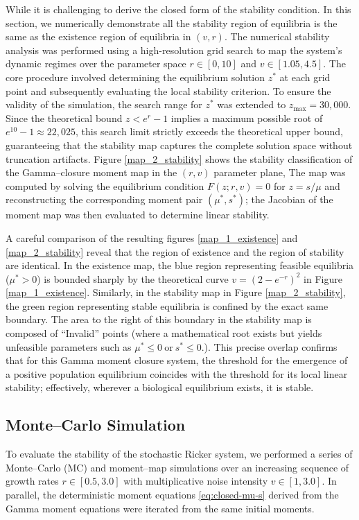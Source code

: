 \documentclass[12pt]{article}
\theoremstyle{definition}
\begin{document}
While it is challenging to derive the closed form of the stability condition. In this section, we numerically demonstrate all the stability region of equilibria is the same as the existence region of equilibria in $(v,r)$. The numerical stability analysis was performed using a high-resolution grid search to map the system's dynamic regimes over the parameter space $r \in [0, 10]$ and $v \in [1.05, 4.5]$. The core procedure involved determining the equilibrium solution $z^*$ at each grid point and subsequently evaluating the local stability criterion. To ensure the validity of the simulation, the search range for $z^*$ was extended to $z_{\text{max}} = 30,000$. Since the theoretical bound $z < e^r - 1$ implies a maximum possible root of $e^{10} - 1 \approx 22,025$, this search limit strictly exceeds the theoretical upper bound, guaranteeing that the stability map captures the complete solution space without truncation artifacts. Figure \ref{map_2_stability} shows the stability classification of the Gamma--closure moment map in the $(r,v)$ parameter plane, 
The map was computed by solving the equilibrium condition $F(z;r,v)=0$ for $z=s/\mu$ and reconstructing the corresponding 
moment pair $(\mu^*,s^*)$; the Jacobian of the moment map was then evaluated to determine linear stability. 

A careful comparison of the resulting figures \ref{map_1_existence} and \ref{map_2_stability} reveal that the region of existence and the region of stability are identical. In the existence map, the blue region representing feasible equilibria ($\mu^* > 0$) is bounded sharply by the theoretical curve $v = (2 - e^{-r})^2$ in Figure \ref{map_1_existence}. Similarly, in the stability map in Figure \ref{map_2_stability}, the green region representing stable equilibria is confined by the exact same boundary. The area to the right of this boundary in the stability map is composed of ``Invalid'' points (where a mathematical root exists but yields unfeasible parameters such as $\mu^*\le 0\ \text{or}\ s^*\le 0.$). This precise overlap confirms that for this Gamma moment closure system, the threshold for the emergence of a positive population equilibrium coincides with the threshold for its local linear stability; effectively, wherever a biological equilibrium exists, it is stable.


\subsection{Monte--Carlo Simulation}
To evaluate the stability of the stochastic Ricker system, we performed a series of Monte--Carlo (MC) and moment--map simulations over an increasing sequence of growth rates \(r\in[0.5,3.0]\) with multiplicative noise intensity \(v \in [1, 3.0]\). In parallel, the deterministic moment equations 
\eqref{eq:closed-mu-s}
derived from the Gamma moment equations were iterated from the same initial moments.
\end{document}
